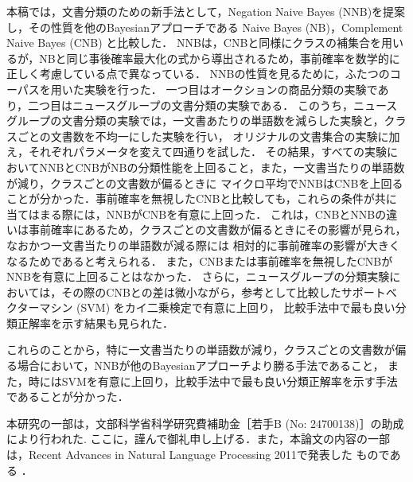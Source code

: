 \documentclass[japanese]{jnlp_1.4}
\begin{document}
本稿では，文書分類のための新手法として，Negation Naive Bayes (NNB)を提案し，その性質を他のBayesianアプローチである
Naive Bayes (NB)，Complement Naive Bayes (CNB) と比較した．
NNBは，CNBと同様にクラスの補集合を用いるが，NBと同じ事後確率最大化の式から導出されるため，事前確率を数学的に正しく考慮している点で異なっている．
NNBの性質を見るために，ふたつのコーパスを用いた実験を行った．
一つ目はオークションの商品分類の実験であり，二つ目はニュースグループの文書分類の実験である．
このうち，ニュースグループの文書分類の実験では，一文書あたりの単語数を減らした実験と，クラスごとの文書数を不均一にした実験を行い，
オリジナルの文書集合の実験に加え，それぞれパラメータを変えて四通りを試した．
その結果，すべての実験においてNNBとCNBがNBの分類性能を上回ること，また，一文書当たりの単語数が減り，クラスごとの文書数が偏るときに
マイクロ平均でNNBはCNBを上回ることが分かった．事前確率を無視したCNBと比較しても，これらの条件が共に当てはまる際には，NNBがCNBを有意に上回った．
これは，CNBとNNBの違いは事前確率にあるため，クラスごとの文書数が偏るときにその影響が見られ，なおかつ一文書当たりの単語数が減る際には
相対的に事前確率の影響が大きくなるためであると考えられる．
また，CNBまたは事前確率を無視したCNBがNNBを有意に上回ることはなかった．
さらに，ニュースグループの分類実験においては，その際のCNBとの差は微小ながら，参考として比較したサポートベクターマシン (SVM) をカイ二乗検定で有意に上回り，
比較手法中で最も良い分類正解率を示す結果も見られた．

これらのことから，特に一文書当たりの単語数が減り，クラスごとの文書数が偏る場合において，NNBが他のBayesianアプローチより勝る手法であること，
また，時にはSVMを有意に上回り，比較手法中で最も良い分類正解率を示す手法であることが分かった．



\acknowledgment

本研究の一部は，文部科学省科学研究費補助金［若手B (No: 24700138)］の助成により行われた.
ここに，謹んで御礼申し上げる．また，本論文の内容の一部は，Recent Advances in Natural Language Processing 2011で発表した
ものである \cite{Komiya}．
\end{document}
